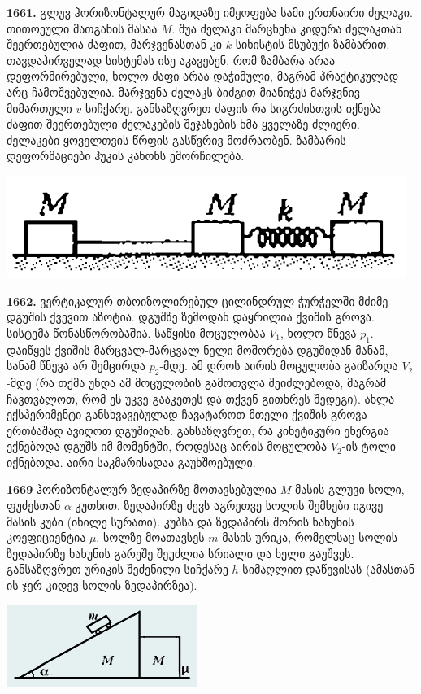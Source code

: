 \documentclass[12pt,a4paper,]{report}
\begin{document}
\textbf{1661.} გლუვ ჰორიზონტალურ მაგიდაზე იმყოფება სამი ერთნაირი ძელაკი. თითოეული მათგანის მასაა $M$. შუა ძელაკი მარცხენა კიდურა ძელაკთან შეერთებულია ძაფით, მარჯვენასთან კი $k$ სიხისტის მსუბუქი ზამბარით. თავდაპირველად სისტემას ისე აკავებენ, რომ ზამბარა არაა დეფორმირებული, ხოლო ძაფი არაა დაჭიმული, მაგრამ პრაქტიკულად არც ჩამოშვებულია. მარჯვენა ძელაკს ბიძგით მიანიჭეს მარჯვნივ მიმართული $v$ სიჩქარე. განსაზღვრეთ ძაფის რა სიგრძისთვის იქნება ძაფით შეერთებული ძელაკების შეჯახების ხმა ყველაზე ძლიერი. ძელაკები ყოველთვის წრფის გასწვრივ მოძრაობენ. ზამბარის დეფორმაციები ჰუკის კანონს ემორჩილება.
		\begin{center}
			\includegraphics[scale=0.5]{images/F1661.png}
		\end{center}

\textbf{1662.} ვერტიკალურ თბოიზოლირებულ ცილინდრულ ჭურჭელში მძიმე დგუშის ქვევით აზოტია. დგუშზე ზემოდან დაყრილია ქვიშის გროვა. სისტემა წონასწორობაშია. საწყისი მოცულობაა $V_1$, ხოლო წნევა $p_1 $. დაიწყეს ქვიშის მარცვალ-მარცვალ ნელი მოშორება დგუშიდან მანამ, სანამ წნევა არ შემცირდა $p_2$-მდე. ამ დროს აირის მოცულობა გაიზარდა $V_2$-მდე (რა თქმა უნდა ამ მოცულობის გამოთვლა შეიძლებოდა, მაგრამ ჩავთვალოთ, რომ ეს უკვე გააკეთეს და თქვენ გითხრეს შედეგი). ახლა ექსპერიმენტი განსხვავებულად ჩავატაროთ მთელი ქვიშის გროვა ერთბაშად ავიღოთ დგუშიდან. განსაზღვრეთ, რა კინეტიკური ენერგია ექნებოდა დგუშს იმ მომენტში, როდესაც აირის მოცულობა $V_2$-ის ტოლი იქნებოდა. აირი საკმარისადაა გაუხშოებული.

\textbf{1669} ჰორიზონტალურ ზედაპირზე მოთავსებულია $M$ მასის გლუვი სოლი, ფუძესთან $\alpha$ კუთხით. ზედაპირზე ძევს აგრეთვე სოლის შემხები იგივე მასის კუბი (იხილე სურათი). კუბსა და ზედაპირს შორის ხახუნის კოეფიციენტია $\mu$. სოლზე მოათავსეს $m$ მასის ურიკა, რომელსაც სოლის ზედაპირზე ხახუნის გარეშე შეუძლია სრიალი და ხელი გაუშვეს. განსაზღვრეთ ურიკის შეძენილი სიჩქარე $h$ სიმაღლით დაწევისას (ამასთან ის ჯერ კიდევ სოლის ზედაპირზეა).
		\begin{center}
			\includegraphics[scale=0.5]{images/F1669}
		\end{center}
\end{document}
